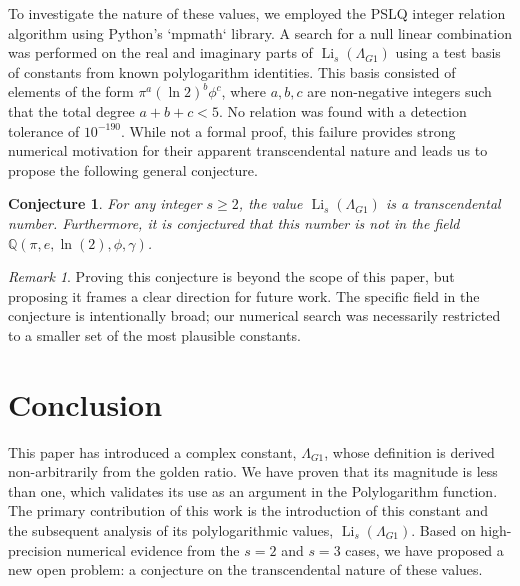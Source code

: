 \documentclass{amsart}
\theoremstyle{plain}
\newtheorem{conjecture}[theorem]{Conjecture}
\theoremstyle{definition}
\theoremstyle{remark}
\newtheorem*{remark}{Remark}
\DeclareMathOperator{\Li}{Li} %
\newcommand{\LambdaG}{\Lambda_{G1}}
\newcommand{\phiG}{\phi}
\begin{document}
To investigate the nature of these values, we employed the PSLQ integer relation algorithm using Python's `mpmath` library. A search for a null linear combination was performed on the real and imaginary parts of $\Li_s(\LambdaG)$ using a test basis of constants from known polylogarithm identities. This basis consisted of elements of the form $\pi^a (\ln 2)^b \phi^c$, where $a,b,c$ are non-negative integers such that the total degree $a+b+c < 5$. No relation was found with a detection tolerance of $10^{-190}$. While not a formal proof, this failure provides strong numerical motivation for their apparent transcendental nature and leads us to propose the following general conjecture.
\begin{conjecture}
For any integer $s \ge 2$, the value $\Li_s(\LambdaG)$ is a transcendental number. Furthermore, it is conjectured that this number is not in the field $\mathbb{Q}(\pi, e, \ln(2), \phiG, \gamma)$.
\end{conjecture}
\begin{remark}
Proving this conjecture is beyond the scope of this paper, but proposing it frames a clear direction for future work. The specific field in the conjecture is intentionally broad; our numerical search was necessarily restricted to a smaller set of the most plausible constants.
\end{remark}

\section{Conclusion}
This paper has introduced a complex constant, $\LambdaG$, whose definition is derived non-arbitrarily from the golden ratio. We have proven that its magnitude is less than one, which validates its use as an argument in the Polylogarithm function. The primary contribution of this work is the introduction of this constant and the subsequent analysis of its polylogarithmic values, $\Li_s(\LambdaG)$. Based on high-precision numerical evidence from the $s=2$ and $s=3$ cases, we have proposed a new open problem: a conjecture on the transcendental nature of these values.

\end{document}
